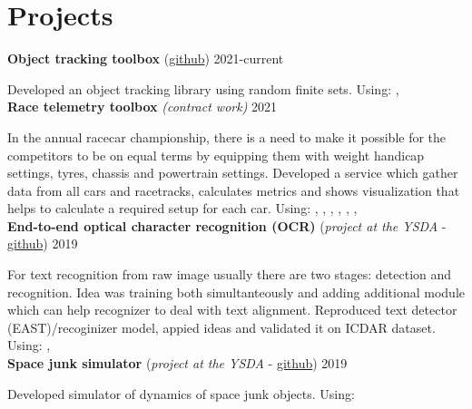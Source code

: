 \section*{\sectionformat Projects}
\textbf{Object tracking toolbox} (\href{https://github.com/neer201/Multi-Object-Tracking-for-Automotive-Systems-in-python}{github}) \hfill 2021-current
\par
Developed an object tracking library using random finite sets.
Using: , 
\\
% 
\textbf{Race telemetry toolbox} \textit{(contract work)} \hfill 2021
\par
In the annual racecar championship, there is a need to make it possible for the competitors to be on equal terms by equipping them with weight handicap settings, tyres, chassis and powertrain settings.
Developed a service which gather data from all cars and racetracks, calculates metrics and shows visualization that helps to calculate a required setup for each car.
Using: , , , , , , 
\\
\textbf{End-to-end optical character recognition (OCR)} (\textit{project at the YSDA} - \href{https://github.com/neer201/end2end_OCR}{github})  \hfill 2019
\par
For text recognition from raw image usually there are two stages: detection and recognition. Idea was training both simultanteously and adding additional module which can help recognizer to deal with text alignment.
Reproduced text detector (EAST)/recoginizer model, appied ideas and validated it on ICDAR dataset.
Using: , 
% 
\\
\textbf{Space junk simulator} (\textit{project at the YSDA} - \href{https://github.com/neer201/space_junk_simulator}{github})   \hfill 2019
\par
Developed simulator of dynamics of space junk objects.
Using: 
